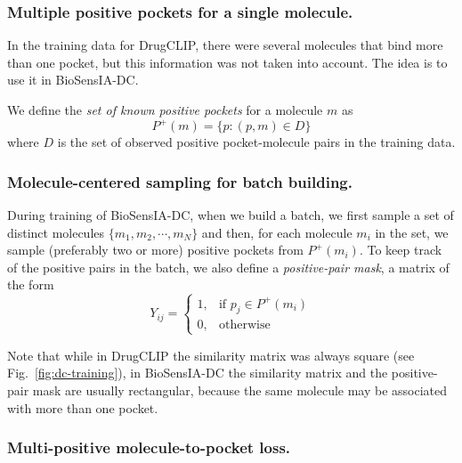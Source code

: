 \documentclass[12pt,fleqn]{article}
\begin{document}
\subsubsection{Multiple positive pockets for a single molecule.}
\label{sec:mult-posit-pock}

In the training data for DrugCLIP, there were several molecules that
bind more than one pocket, but this information was not taken into
account. The idea is to use it in BioSensIA-DC.

We define the \emph{set of known positive pockets} for a molecule $m$ as
\begin{equation}
  \label{eq:positives}
  P^{+}(m) = \{p : (p,m) \in D\}
\end{equation}
where $D$ is the set of observed positive pocket-molecule pairs in the
training data.

\subsubsection{Molecule-centered sampling for batch building.}
\label{sec:molec-cent-sampl}

During training of BioSensIA-DC, when we build a batch, we first sample
a set of distinct molecules $\{m_1, m_2, \cdots, m_N\}$ and then, for
each molecule $m_i$ in the set, we sample (preferably two or more)
positive pockets from $P^+(m_i)$. To keep track of the positive pairs
in the batch, we also define a \emph{positive-pair mask}, a matrix of
the form
\begin{equation}
  \label{eq:mask}  
  Y_{ij} =
  \begin{cases}
    1, & \text{if } p_j \in P^{+}(m_i)\\
    0, & \text{otherwise}
  \end{cases}
\end{equation}

Note that while in DrugCLIP the similarity matrix was always square
(see Fig.~\ref{fig:dc-training}), in BioSensIA-DC the similarity
matrix and the positive-pair mask are usually rectangular, because the
same molecule may be associated with more than one pocket.

\subsubsection{Multi-positive molecule-to-pocket loss.}
\label{sec:multi-posit-mol}
\end{document}
